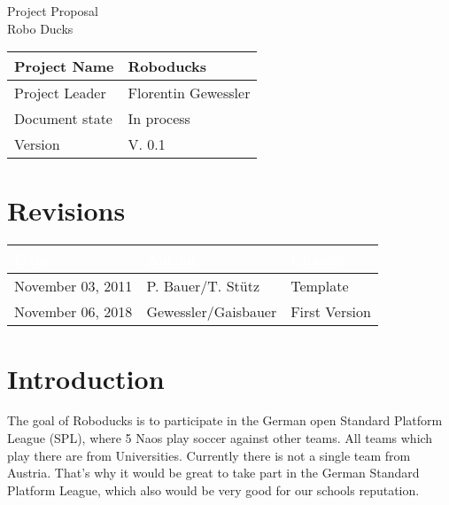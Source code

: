 \documentclass[12pt]{article}
\theoremstyle{definition}
\newenvironment{explanation}{%
   \setlength{\parindent}{0pt}
   \itshape
   \color{blue}
}{}
\newcommand{\projectname}{Roboducks}
\newcommand{\productname}{Robo Ducks}
\newcommand{\projectleader}{Florentin Gewessler}
\newcommand{\documentstatus}{In process}
\newcommand{\version}{V. 0.1}
\begin{document}
\begin{titlepage}
\begin{flushright}

\end{flushright}

\vspace{10em}

\begin{center}
{\Huge Project Proposal} \\[3em]
{\LARGE \productname} \\[3em]
\end{center}

\begin{flushleft}
\begin{tabular}{|l|l|}
\hline
Project Name & \projectname \\ \hline
Project Leader & \projectleader \\ \hline
Document state & \documentstatus \\ \hline
Version & \version \\ \hline
\end{tabular}
\end{flushleft}

\end{titlepage}
\section*{Revisions}
\begin{tabular}{|l|l|l|}
\hline
\cellcolor[gray]{0.5}\textcolor{white}{Date} & \cellcolor[gray]{0.5}\textcolor{white}{Author} & \cellcolor[gray]{0.5}\textcolor{white}{Change} \\ \hline
November 03, 2011&P. Bauer/T. Stütz&Template \\ \hline
November 06, 2018&Gewessler/Gaisbauer&First Version\\ \hline
\end{tabular}
\pagebreak

\tableofcontents
\pagebreak

\section{Introduction}
\begin{explanation}
The goal of Roboducks is to participate in the German open Standard Platform League (SPL), where 5 Naos play soccer against other teams. All teams which play there are from Universities. Currently there is not a single team from Austria. That's why it would be great to take part in the German Standard Platform League, which also would be very good for our schools reputation.\\
\end{explanation}
\pagebreak
\end{document}

